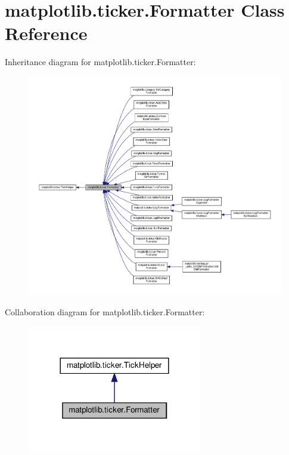 \hypertarget{classmatplotlib_1_1ticker_1_1Formatter}{}\section{matplotlib.\+ticker.\+Formatter Class Reference}
\label{classmatplotlib_1_1ticker_1_1Formatter}


Inheritance diagram for matplotlib.\+ticker.\+Formatter\+:
\nopagebreak
\begin{figure}[H]
\begin{center}
\leavevmode
\includegraphics[width=350pt]{classmatplotlib_1_1ticker_1_1Formatter__inherit__graph}
\end{center}
\end{figure}


Collaboration diagram for matplotlib.\+ticker.\+Formatter\+:
\nopagebreak
\begin{figure}[H]
\begin{center}
\leavevmode
\includegraphics[width=216pt]{classmatplotlib_1_1ticker_1_1Formatter__coll__graph}
\end{center}
\end{figure}
